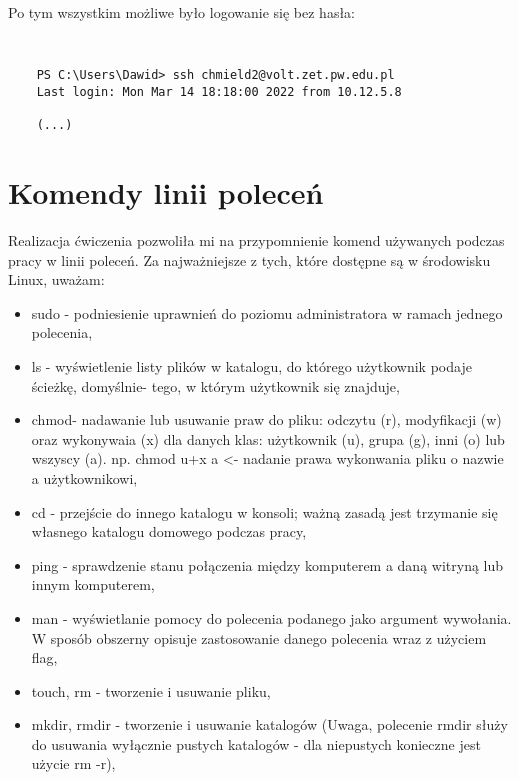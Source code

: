 \documentclass[a4paper,11pt]{article}
\begin{document}
Po tym wszystkim możliwe było logowanie się bez hasła:

{\tt
\begin{verbatim}
    PS C:\Users\Dawid> ssh chmield2@volt.zet.pw.edu.pl
    Last login: Mon Mar 14 18:18:00 2022 from 10.12.5.8

    (...)
\end{verbatim}
}

\section{Komendy linii poleceń}
Realizacja ćwiczenia pozwoliła mi na przypomnienie komend używanych podczas pracy w linii poleceń. Za najważniejsze z tych, które dostępne są w środowisku Linux, uważam:

\begin{itemize}


\item sudo - podniesienie uprawnień do poziomu administratora w ramach jednego polecenia,

\item ls - wyświetlenie listy plików w katalogu, do którego użytkownik podaje ścieżkę, domyślnie- tego, w którym użytkownik się znajduje,

\item chmod- nadawanie lub usuwanie praw do pliku: odczytu (r), modyfikacji (w) oraz wykonywaia (x) dla danych klas: użytkownik (u), grupa (g), inni (o) lub wszyscy (a). np. chmod u+x a <- nadanie prawa wykonwania pliku o nazwie a użytkownikowi,

\item cd - przejście do innego katalogu w konsoli; ważną zasadą jest trzymanie się własnego katalogu domowego podczas pracy,

\item ping - sprawdzenie stanu połączenia między komputerem a daną witryną lub innym komputerem,

\item man - wyświetlanie pomocy do polecenia podanego jako argument wywołania. W sposób obszerny opisuje zastosowanie danego polecenia wraz z użyciem flag,

\item touch, rm - tworzenie i usuwanie pliku,

\item mkdir, rmdir - tworzenie i usuwanie katalogów (Uwaga, polecenie rmdir służy do usuwania wyłącznie pustych katalogów - dla niepustych konieczne jest użycie rm -r),


\end{itemize}
\end{document}

